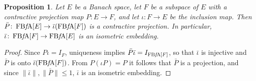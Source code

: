 \documentclass{memo-l}
\newtheorem{prop}[theorem]{Proposition}
\theoremstyle{definition}
\theoremstyle{remark}
\numberwithin{section}{chapter}
\numberwithin{equation}{chapter}
\newcommand{\FBFA}[1]{\operatorname{FB{\it f}\!A}[#1]}
\begin{document}
\begin{prop}\label{prop:complemented}
    Let $E$ be a Banach space, let $F$ be a subspace of $E$ with a
    contractive projection map
    $P\colon E\to F$, and
    let $\iota \colon F\to E$ be the inclusion map. Then
    $\bar{P}\colon \FBFA E\to \bar\iota (\FBFA F)$ is a contractive projection. In
    particular,
    $\bar{\iota}\colon \FBFA F\to \FBFA E$ is an isometric
    embedding.
\end{prop}
\begin{proof}
    Since $P \iota =I_F$, uniqueness implies $\bar{P}\bar{\iota
    }=I_{\FBFA F}$, so that $\bar
    \iota $ is injective and $\bar{P}$ is onto $\bar \iota (\FBFA
    F)$. From $P (\iota P)=P$ it follows that $\bar{P}$ is a
    projection, and since $\|\bar \iota\|, \|\bar{P}\|\le 1$,
    $\bar\iota $ is an isometric embedding.
\end{proof}
\end{document}
